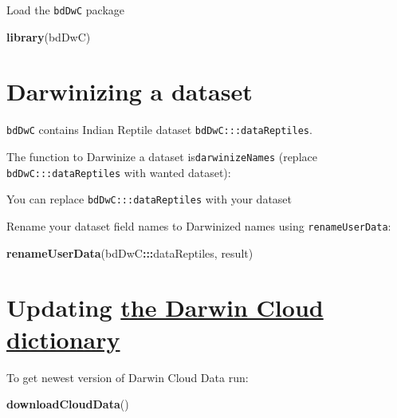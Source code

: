 \documentclass[]{book}
\newenvironment{Shaded}{\begin{snugshade}}{\end{snugshade}}
\newcommand{\KeywordTok}[1]{\textcolor[rgb]{0.13,0.29,0.53}{\textbf{#1}}}
\newcommand{\DataTypeTok}[1]{\textcolor[rgb]{0.13,0.29,0.53}{#1}}
\newcommand{\StringTok}[1]{\textcolor[rgb]{0.31,0.60,0.02}{#1}}
\newcommand{\OperatorTok}[1]{\textcolor[rgb]{0.81,0.36,0.00}{\textbf{#1}}}
\newcommand{\NormalTok}[1]{#1}
\theoremstyle{definition}
\theoremstyle{definition}
\theoremstyle{definition}
\theoremstyle{remark}
\begin{document}
Load the \texttt{bdDwC} package

\begin{Shaded}
\begin{Highlighting}[]
    \KeywordTok{library}\NormalTok{(bdDwC)}
\end{Highlighting}
\end{Shaded}

\section{Darwinizing a dataset}\label{darwinizing-a-dataset}

\texttt{bdDwC} contains Indian Reptile dataset
\texttt{bdDwC:::dataReptiles}.

The function to Darwinize a dataset is\texttt{darwinizeNames} (replace
\texttt{bdDwC:::dataReptiles} with wanted dataset):

\begin{Shaded}
\end{Shaded}

You can replace \texttt{bdDwC:::dataReptiles} with your dataset

Rename your dataset field names to Darwinized names using
\texttt{renameUserData}:

\begin{Shaded}
\begin{Highlighting}[]
\KeywordTok{renameUserData}\NormalTok{(bdDwC}\OperatorTok{:::}\NormalTok{dataReptiles, result)}
\end{Highlighting}
\end{Shaded}

\section{\texorpdfstring{Updating
\protect\hyperlink{the-darwin-cloud-dictionary}{the Darwin Cloud
dictionary}}{Updating the Darwin Cloud dictionary}}\label{updating-the-darwin-cloud-dictionary}

To get newest version of Darwin Cloud Data run:

\begin{Shaded}
\begin{Highlighting}[]
\KeywordTok{downloadCloudData}\NormalTok{()}
\end{Highlighting}
\end{Shaded}
\end{document}
